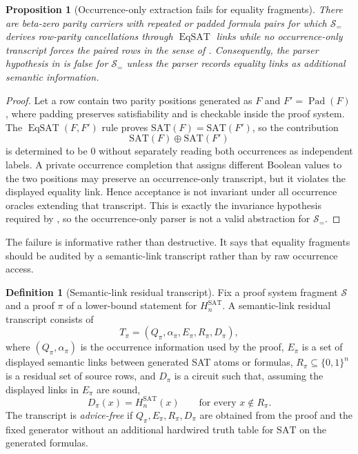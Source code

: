 \documentclass[11pt]{article}
\newtheorem{proposition}[theorem]{Proposition}
\theoremstyle{definition}
\newtheorem{definition}[theorem]{Definition}
\newcommand{\bits}{\{0,1\}}
\newcommand{\SAT}{\mathrm{SAT}}
\newcommand{\Hsat}{H_n^{\SAT}}
\newcommand{\EqSAT}{\operatorname{EqSAT}}
\begin{document}
\begin{proposition}[Occurrence-only extraction fails for equality fragments]\label{prop:eqsat-occurrence-failure}
There are beta-zero parity carriers with repeated or padded formula pairs for which $\mathcal{S}_{=}$ derives row-parity cancellations through $\EqSAT$ links while no occurrence-only transcript forces the paired rows in the sense of . Consequently, the parser hypothesis in  is false for $\mathcal{S}_{=}$ unless the parser records equality links as additional semantic information.
\end{proposition}

\begin{proof}
Let a row contain two parity positions generated as $F$ and $F'=\operatorname{Pad}(F)$, where padding preserves satisfiability and is checkable inside the proof system. The $\EqSAT(F,F')$ rule proves $\SAT(F)=\SAT(F')$, so the contribution
\[
  \SAT(F)\oplus \SAT(F')
\]
is determined to be $0$ without separately reading both occurrences as independent labels. A private occurrence completion that assigns different Boolean values to the two positions may preserve an occurrence-only transcript, but it violates the displayed equality link. Hence acceptance is not invariant under all occurrence oracles extending that transcript. This is exactly the invariance hypothesis required by , so the occurrence-only parser is not a valid abstraction for $\mathcal{S}_{=}$.
\end{proof}

The failure is informative rather than destructive. It says that equality fragments should be audited by a semantic-link transcript rather than by raw occurrence access.

\begin{definition}[Semantic-link residual transcript]\label{def:semantic-link-transcript}
Fix a proof system fragment $\mathcal{S}$ and a proof $\pi$ of a lower-bound statement for $\Hsat$. A semantic-link residual transcript consists of
\[
  T_\pi=(Q_\pi,\alpha_\pi,E_\pi,R_\pi,D_\pi),
\]
where $(Q_\pi,\alpha_\pi)$ is the occurrence information used by the proof, $E_\pi$ is a set of displayed semantic links between generated SAT atoms or formulas, $R_\pi\subseteq\bits^n$ is a residual set of source rows, and $D_\pi$ is a circuit such that, assuming the displayed links in $E_\pi$ are sound,
\[
  D_\pi(x)=\Hsat(x)\qquad\text{for every }x\notin R_\pi .
\]
The transcript is \emph{advice-free} if $Q_\pi,E_\pi,R_\pi,D_\pi$ are obtained from the proof and the fixed generator without an additional hardwired truth table for $\SAT$ on the generated formulas.
\end{definition}
\end{document}
